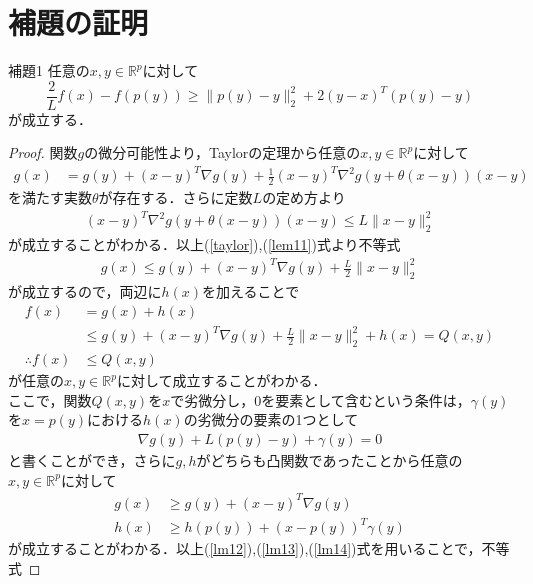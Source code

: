 \documentclass{jsarticle}
\theoremstyle{definition}
\theoremstyle{mystyle} %
\begin{document}
\large
\section*{補題の証明}
\begin{itembox}[l]{補題1}
任意の$x,y\in \mathbb{R}^p$に対して
$$\frac{2}{L}f(x)-f(p(y))\geq \|p(y)-y\|_2^2+2(y-x)^T(p(y)-y)$$
が成立する．
\end{itembox}
\begin{proof}
関数$g$の微分可能性より，Taylorの定理から任意の$x,y\in \mathbb{R}^p$に対して
\begin{align}
\label{taylor}
g(x)&=g(y)+(x-y)^T\nabla g(y)+\frac{1}{2}(x-y)^T\nabla^2 g(y+\theta(x-y))(x-y)
\end{align}
を満たす実数$\theta$が存在する．さらに定数$L$の定め方より
\begin{align}
\label{lem11}
(x-y)^T\nabla^2 g(y+\theta(x-y))(x-y)\leq L\|x-y\|_2^2
\end{align}
が成立することがわかる．以上(\ref{taylor}),(\ref{lem11})式より不等式
\begin{align*}
g(x)\leq g(y) +(x-y)^T \nabla g(y)+\frac{L}{2}\|x-y\|_2^2
\end{align*}
が成立するので，両辺に$h(x)$を加えることで
\begin{equation}
\begin{split}
\label{lem15}
f(x)&=g(x)+h(x)\\
&\leq g(y) +(x-y)^T \nabla g(y)+\frac{L}{2}\|x-y\|_2^2+h(x)=Q(x,y)\\
\therefore f(x)&\leq Q(x,y)
\end{split}
\end{equation}
が任意の$x,y\in \mathbb{R}^p$に対して成立することがわかる．
\\

ここで，関数$Q(x,y)$を$x$で劣微分し，$0$を要素として含むという条件は，$\gamma(y)$を$x=p(y)$における$h(x)$の劣微分の要素の1つとして
\begin{align}
\label{lm12}
\nabla g(y)+L (p(y)-y)+\gamma(y)=0
\end{align}
と書くことができ，さらに$g,h$がどちらも凸関数であったことから任意の$x,y\in \mathbb{R}^p$に対して
\begin{align}
\label{lm13}
g(x)&\geq g(y)+(x-y)^T\nabla g(y)\\
\label{lm14}
h(x)&\geq h(p(y))+(x-p(y))^T\gamma(y)
\end{align}
が成立することがわかる．以上(\ref{lm12}),(\ref{lm13}),(\ref{lm14})式を用いることで，不等式


\end{proof}
\end{document}
